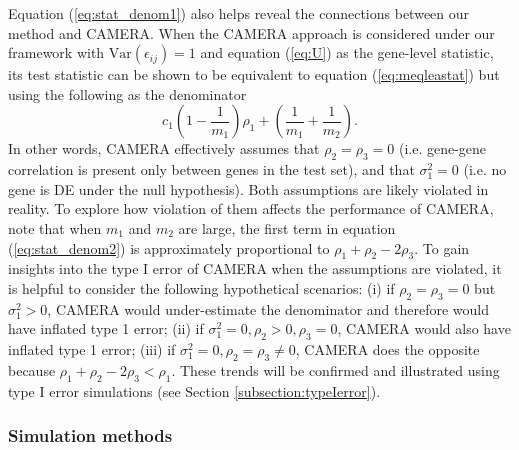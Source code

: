 	Equation (\ref{eq:stat_denom1}) also helps reveal the connections between our method and 
	CAMERA. When the CAMERA approach is considered under our framework with 
	$\mbox{Var}(\epsilon_{ij})=1$ and equation (\ref{eq:U}) as the gene-level statistic, its test 
	statistic can be shown to be equivalent to equation (\ref{eq:meqleastat}) but using the 
	following as the denominator
	\begin{equation}\label{eq:stat_denom2}
	c_1(1-\dfrac{1}{m_1})\rho_1 + (\dfrac{1}{m_1}+\dfrac{1}{m_2}).
	\end{equation}
	In other words, CAMERA effectively assumes that $\rho_2=\rho_3=0$ (i.e. gene-gene correlation 
	is present only between genes in the test set), and that $\sigma_1^2=0$ (i.e. no gene is DE 
	under the null hypothesis). Both assumptions are likely violated in reality. To explore how 
	violation of them affects the performance of CAMERA, note that when $m_1$ and $m_2$ are large, 
	the first term in equation (\ref{eq:stat_denom2}) is approximately proportional to 
	$\rho_1+\rho_2-2\rho_3$. To gain insights into the type I error of CAMERA when the assumptions 
	are violated, it is helpful to consider the following hypothetical scenarios: (i) if 
	$\rho_2=\rho_3=0$ but $\sigma_1^2>0$, CAMERA would under-estimate the denominator and therefore 
	would have inflated type 1 error; (ii) if $\sigma_1^2=0, \rho_2>0, \rho_3=0$, CAMERA would also 
	have inflated type 1 error; (iii) if $\sigma_1^2=0, \rho_2=\rho_3\ne 0$, CAMERA does the 
	opposite because $\rho_1+\rho_2-2\rho_3 < \rho_1$. These trends will be confirmed and 
	illustrated using type I error simulations (see Section \ref{subsection:typeIerror}).

	
	
	
	\subsubsection{Simulation methods}
	
